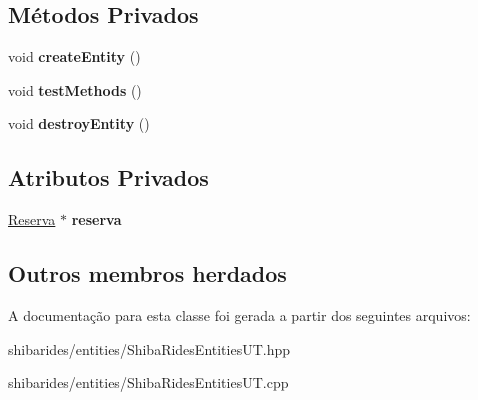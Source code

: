 \subsection*{Métodos Privados}
\begin{DoxyCompactItemize}
\item 
void {\bfseries create\+Entity} ()\hypertarget{classshibarides_1_1TUReserva_a266b7710ca60e8f7eef5403f30e035ed}{}\label{classshibarides_1_1TUReserva_a266b7710ca60e8f7eef5403f30e035ed}

\item 
void {\bfseries test\+Methods} ()\hypertarget{classshibarides_1_1TUReserva_a92a27b80ae98c5e2174a3ee821295b39}{}\label{classshibarides_1_1TUReserva_a92a27b80ae98c5e2174a3ee821295b39}

\item 
void {\bfseries destroy\+Entity} ()\hypertarget{classshibarides_1_1TUReserva_a384d2140f8846e0f49e98b6d7363b9f0}{}\label{classshibarides_1_1TUReserva_a384d2140f8846e0f49e98b6d7363b9f0}

\end{DoxyCompactItemize}
\subsection*{Atributos Privados}
\begin{DoxyCompactItemize}
\item 
\hyperlink{classshibarides_1_1Reserva}{Reserva} $\ast$ {\bfseries reserva}\hypertarget{classshibarides_1_1TUReserva_a81066f3e8c32477d0510c5ae6436dd87}{}\label{classshibarides_1_1TUReserva_a81066f3e8c32477d0510c5ae6436dd87}

\end{DoxyCompactItemize}
\subsection*{Outros membros herdados}


A documentação para esta classe foi gerada a partir dos seguintes arquivos\+:\begin{DoxyCompactItemize}
\item 
shibarides/entities/Shiba\+Rides\+Entities\+U\+T.\+hpp\item 
shibarides/entities/Shiba\+Rides\+Entities\+U\+T.\+cpp\end{DoxyCompactItemize}
